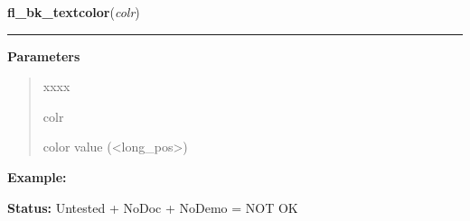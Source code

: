 \hspace{.8\funcindent}\begin{boxedminipage}{\funcwidth}

    \raggedright \textbf{fl\_bk\_textcolor}(\textit{colr})

    \vspace{-1.5ex}

    \rule{\textwidth}{0.5\fboxrule}
\setlength{\parskip}{2ex}
\setlength{\parskip}{1ex}
      \textbf{Parameters}
      \vspace{-1ex}

      \begin{quote}
        \begin{Ventry}{xxxx}

          \item[colr]

          color value ({\textless}long\_pos{\textgreater})

        \end{Ventry}

      \end{quote}

\textbf{Example:} 

\textbf{Status:} Untested + NoDoc + NoDemo = NOT OK



    \end{boxedminipage}

    \label{xformslib:library:fl_set_gamma}

    \vspace{0.5ex}

